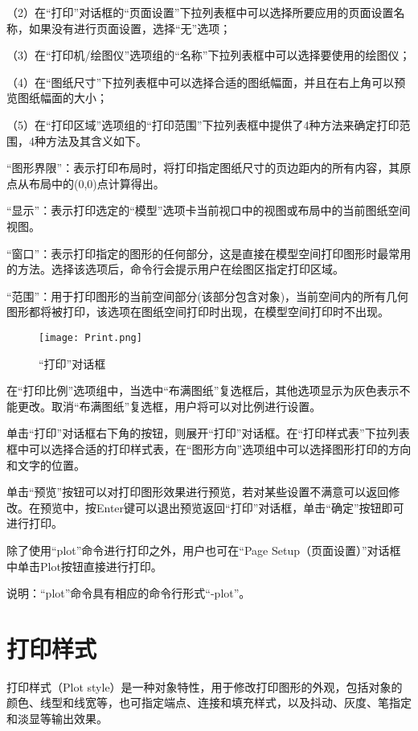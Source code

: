 （2）在“打印”对话框的“页面设置”下拉列表框中可以选择所要应用的页面设置名称，如果没有进行页面设置，选择“无”选项；

（3）在“打印机/绘图仪”选项组的“名称”下拉列表框中可以选择要使用的绘图仪；

（4）在“图纸尺寸”下拉列表框中可以选择合适的图纸幅面，并且在右上角可以预览图纸幅面的大小；

（5）在“打印区域”选项组的“打印范围”下拉列表框中提供了4种方法来确定打印范围，4种方法及其含义如下。

\begin{compactitem}
\item “图形界限”：表示打印布局时，将打印指定图纸尺寸的页边距内的所有内容，其原点从布局中的(0,0)点计算得出。
\item “显示”：表示打印选定的“模型”选项卡当前视口中的视图或布局中的当前图纸空间视图。
\item “窗口”：表示打印指定的图形的任何部分，这是直接在模型空间打印图形时最常用的方法。选择该选项后，命令行会提示用户在绘图区指定打印区域。
\item “范围”：用于打印图形的当前空间部分(该部分包含对象)，当前空间内的所有几何图形都将被打印，该选项在图纸空间打印时出现，在模型空间打印时不出现。
\end{compactitem}

\begin{figure}[htbp]
\centering
\texttt{[image: Print.png]}
\caption{“打印”对话框}
\end{figure}

在“打印比例”选项组中，当选中“布满图纸”复选框后，其他选项显示为灰色表示不能更改。取消“布满图纸”复选框，用户将可以对比例进行设置。

单击“打印”对话框右下角的按钮，则展开“打印”对话框。在“打印样式表”下拉列表框中可以选择合适的打印样式表，在“图形方向”选项组中可以选择图形打印的方向和文字的位置。

单击“预览”按钮可以对打印图形效果进行预览，若对某些设置不满意可以返回修改。在预览中，按Enter键可以退出预览返回“打印”对话框，单击“确定”按钮即可进行打印。

除了使用“plot”命令进行打印之外，用户也可在“Page Setup（页面设置）”对话框中单击Plot按钮直接进行打印。

说明：“plot”命令具有相应的命令行形式“-plot”。

\chapter{打印样式}

打印样式（Plot style）是一种对象特性，用于修改打印图形的外观，包括对象的颜色、线型和线宽等，也可指定端点、连接和填充样式，以及抖动、灰度、笔指定和淡显等输出效果。

